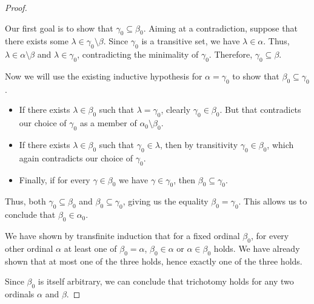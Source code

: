 \begin{proof}
\begin{itemize}
    Our first goal is to show that \( \gamma_0 \subseteq \beta_0 \). Aiming at a contradiction, suppose that there exists some \( \lambda \in \gamma_0 \setminus \beta \). Since \( \gamma_0 \) is a transitive set, we have \( \lambda \in \alpha \). Thus, \( \lambda \in \alpha \setminus \beta \) and \( \lambda \in \gamma_0 \), contradicting the minimality of \( \gamma_0 \). Therefore, \( \gamma_0 \subseteq \beta \).

    Now we will use the existing inductive hypothesis for \( \alpha = \gamma_0 \) to show that \( \beta_0 \subseteq \gamma_0 \).

    \begin{itemize}
      \item If there exists \( \lambda \in \beta_0 \) such that \( \lambda = \gamma_0 \), clearly \( \gamma_0 \in \beta_0 \). But that contradicts our choice of \( \gamma_0 \) as a member of \( \alpha_0 \setminus \beta_0 \).

      \item If there exists \( \lambda \in \beta_0 \) such that \( \gamma_0 \in \lambda \), then by transitivity \( \gamma_0 \in \beta_0 \), which again contradicts our choice of \( \gamma_0 \).

      \item Finally, if for every \( \gamma \in \beta_0 \) we have \( \gamma \in \gamma_0 \), then \( \beta_0 \subseteq \gamma_0 \).
    \end{itemize}

    Thus, both \( \gamma_0 \subseteq \beta_0 \) and \( \beta_0 \subseteq \gamma_0 \), giving us the equality \( \beta_0 = \gamma_0 \). This allows us to conclude that \( \beta_0 \in \alpha_0 \).
  \end{itemize}

  We have shown by transfinite induction that for a fixed ordinal \( \beta_0 \), for every other ordinal \( \alpha \) at least one of \( \beta_0 = \alpha \), \( \beta_0 \in \alpha \) or \( \alpha \in \beta_0 \) holds. We have already shown that at most one of the three holds, hence exactly one of the three holds.

  Since \( \beta_0 \) is itself arbitrary, we can conclude that trichotomy holds for any two ordinals \( \alpha \) and \( \beta \).
\end{proof}

